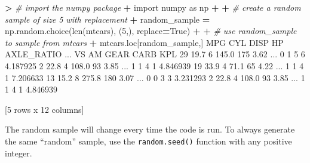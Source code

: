 \documentclass[
]{book}
\newenvironment{Shaded}{\begin{snugshade}}{\end{snugshade}}
\newcommand{\BuiltInTok}[1]{#1}
\newcommand{\CommentTok}[1]{\textcolor[rgb]{0.56,0.35,0.01}{\textit{#1}}}
\newcommand{\DecValTok}[1]{\textcolor[rgb]{0.00,0.00,0.81}{#1}}
\newcommand{\FloatTok}[1]{\textcolor[rgb]{0.00,0.00,0.81}{#1}}
\newcommand{\ImportTok}[1]{#1}
\newcommand{\NormalTok}[1]{#1}
\newcommand{\OperatorTok}[1]{\textcolor[rgb]{0.81,0.36,0.00}{\textbf{#1}}}
\newcommand{\VariableTok}[1]{\textcolor[rgb]{0.00,0.00,0.00}{#1}}
\begin{document}
\begin{Shaded}
\begin{Highlighting}[]
\OperatorTok{\textgreater{}} \CommentTok{\# import the numpy package}
\OperatorTok{+} \ImportTok{import}\NormalTok{ numpy }\ImportTok{as}\NormalTok{ np}
\OperatorTok{+} 
\OperatorTok{+} \CommentTok{\# create a random sample of size 5 with replacement}
\OperatorTok{+}\NormalTok{ random\_sample }\OperatorTok{=}\NormalTok{ np.random.choice(}\BuiltInTok{len}\NormalTok{(mtcars), (}\DecValTok{5}\NormalTok{,), replace}\OperatorTok{=}\VariableTok{True}\NormalTok{)}
\OperatorTok{+} 
\OperatorTok{+} \CommentTok{\# use random\_sample to sample from mtcars}
\OperatorTok{+}\NormalTok{ mtcars.loc[random\_sample,]}
\NormalTok{     MPG  CYL   DISP   HP  AXLE\_RATIO  ...  VS  AM  GEAR CARB       KPL}
\DecValTok{29}  \FloatTok{19.7}    \DecValTok{6}  \FloatTok{145.0}  \DecValTok{175}        \FloatTok{3.62}\NormalTok{  ...   }\DecValTok{0}   \DecValTok{1}     \DecValTok{5}    \DecValTok{6}  \FloatTok{4.187925}
\DecValTok{2}   \FloatTok{22.8}    \DecValTok{4}  \FloatTok{108.0}   \DecValTok{93}        \FloatTok{3.85}\NormalTok{  ...   }\DecValTok{1}   \DecValTok{1}     \DecValTok{4}    \DecValTok{1}  \FloatTok{4.846939}
\DecValTok{19}  \FloatTok{33.9}    \DecValTok{4}   \FloatTok{71.1}   \DecValTok{65}        \FloatTok{4.22}\NormalTok{  ...   }\DecValTok{1}   \DecValTok{1}     \DecValTok{4}    \DecValTok{1}  \FloatTok{7.206633}
\DecValTok{13}  \FloatTok{15.2}    \DecValTok{8}  \FloatTok{275.8}  \DecValTok{180}        \FloatTok{3.07}\NormalTok{  ...   }\DecValTok{0}   \DecValTok{0}     \DecValTok{3}    \DecValTok{3}  \FloatTok{3.231293}
\DecValTok{2}   \FloatTok{22.8}    \DecValTok{4}  \FloatTok{108.0}   \DecValTok{93}        \FloatTok{3.85}\NormalTok{  ...   }\DecValTok{1}   \DecValTok{1}     \DecValTok{4}    \DecValTok{1}  \FloatTok{4.846939}

\NormalTok{[}\DecValTok{5}\NormalTok{ rows x }\DecValTok{12}\NormalTok{ columns]}
\end{Highlighting}
\end{Shaded}

The random sample will change every time the code is run. To always generate the same ``random'' sample, use the \texttt{random.seed()} function with any positive integer.
\end{document}
